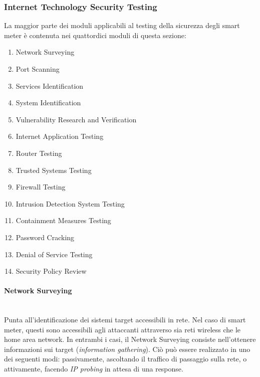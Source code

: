 \subsubsection{Internet Technology Security Testing}
La maggior parte dei moduli applicabili al testing della sicurezza degli smart meter è contenuta nei quattordici moduli di questa sezione:
\begin{enumerate}
	\item Network Surveying
	\item Port Scanning
	\item Services Identification
	\item System Identification
	\item Vulnerability Research and Verification
	\item Internet Application Testing
	\item Router Testing
	\item Trusted Systems Testing
	\item Firewall Testing
	\item Intrusion Detection System Testing
	\item Containment Measures Testing
	\item Password Cracking
	\item Denial of Service Testing
	\item Security Policy Review
\end{enumerate}

\paragraph{Network Surveying}\mbox{}\\
Punta all'identificazione dei sistemi target accessibili in rete. Nel caso di smart meter, questi sono accessibili agli attaccanti attraverso sia reti wireless che le home area network. In entrambi i casi, il Network Surveying consiste nell'ottenere informazioni sui target (\emph{information gathering}).
Ciò può essere realizzato in uno dei seguenti modi: passivamente, ascoltando il traffico di passaggio sulla rete, o attivamente, facendo \emph{IP probing} in attesa di una response.\\

